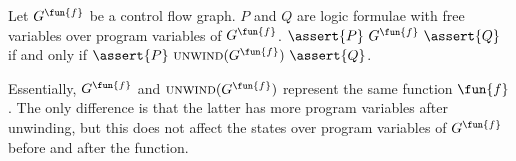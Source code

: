 \begin{proposition}
  Let $G^\fun{f}$ be a control flow graph. $P$ and $Q$ are logic formulae with
  free variables over program variables of $G^\fun{f}$. $\assert{P}\ G^\fun{f}\ 
  \assert{Q}$ if and only if $\assert{P}\ \textsc{unwind} (G^\fun{f})\ \assert{Q}$.
\end{proposition}
Essentially, $G^\fun{f}$ and $\textsc{unwind} (G^\fun{f})$ represent the same function $\fun{f}$. The only difference is that the latter has more program variables after unwinding, but this does not affect the states over program variables of $G^\fun{f}$ before and after the function.
